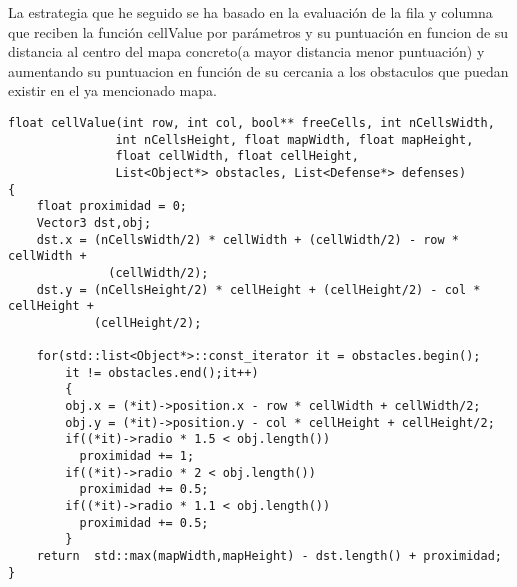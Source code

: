 La estrategia que he seguido se ha basado en la evaluación de la fila y columna
que reciben la función cellValue por parámetros y su puntuación en funcion de
su distancia al centro del mapa concreto(a mayor distancia menor puntuación)
y aumentando su puntuacion en función de su cercania a los obstaculos que puedan
existir en el ya mencionado mapa.

\begin{lstlisting}
float cellValue(int row, int col, bool** freeCells, int nCellsWidth,
               int nCellsHeight, float mapWidth, float mapHeight,
               float cellWidth, float cellHeight,
               List<Object*> obstacles, List<Defense*> defenses)
{
    float proximidad = 0;
    Vector3 dst,obj;
    dst.x = (nCellsWidth/2) * cellWidth + (cellWidth/2) - row * cellWidth +
              (cellWidth/2);
    dst.y = (nCellsHeight/2) * cellHeight + (cellHeight/2) - col * cellHeight +
            (cellHeight/2);

    for(std::list<Object*>::const_iterator it = obstacles.begin();
        it != obstacles.end();it++)
        {
        obj.x = (*it)->position.x - row * cellWidth + cellWidth/2;
        obj.y = (*it)->position.y - col * cellHeight + cellHeight/2;
        if((*it)->radio * 1.5 < obj.length())
          proximidad += 1;
        if((*it)->radio * 2 < obj.length())
          proximidad += 0.5;
        if((*it)->radio * 1.1 < obj.length())
          proximidad += 0.5;
        }
    return  std::max(mapWidth,mapHeight) - dst.length() + proximidad;
}

\end{lstlisting}
